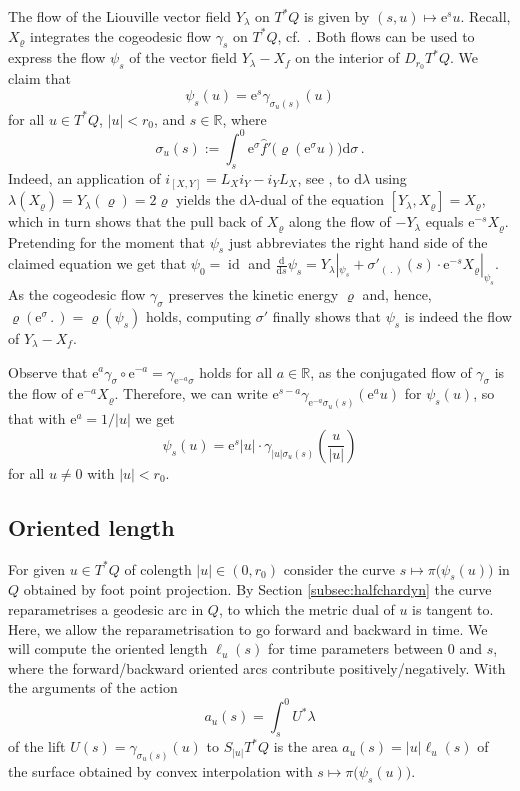 \documentclass{amsart}
\theoremstyle{definition}
\newcommand{\rmd}{\mathrm d}
\newcommand{\rme}{\mathrm e}
\newcommand{\R}{\mathbb R}
\DeclareMathOperator{\id}{\mathrm{id}}
\begin{document}
The flow of the Liouville vector field $Y_{\lambda}$ on $T^*Q$
is given by $(s,u)\mapsto\rme^su$.
Recall,
$X_{\varrho}$ integrates the cogeodesic flow $\gamma_s$
on $T^*Q$,
cf.\ \cite[p.~27-31]{gei08}.
Both flows can be used to express
the flow $\psi_s$ of the vector field $Y_{\lambda}-X_f$
on the interior of $D_{r_0}T^*Q$.
We claim that
\[
\psi_s(u)=\rme^s\gamma_{\sigma_u(s)}(u)
\]
for all $u\in T^*Q$, $|u|<r_0$, and $s\in\R$, where
\[
\sigma_u(s):=
\int_s^0
  \rme^{\sigma}\hat{f}'\big(\varrho(\rme^{\sigma}u)\big)
\rmd\sigma\,.
\]
Indeed,
an application of
$i_{[X,Y]}=L_Xi_Y-i_YL_X$, see \cite[Proposition V.5.3]{lng02},
to $\rmd\lambda$
using $\lambda(X_{\varrho})=Y_{\lambda}(\varrho)=2\varrho$
yields the $\rmd\lambda$-dual of the equation
$[Y_{\lambda},X_{\varrho}]=X_{\varrho}$,
which in turn shows that the pull back of $X_{\varrho}$
along the flow of $-Y_{\lambda}$ equals $\rme^{-s}X_{\varrho}$.
Pretending for the moment
that $\psi_s$ just abbreviates
the right hand side of the claimed equation
we get that $\psi_0=\id$ and
$
\frac{\rmd}{\rmd s}\psi_s=
Y_{\lambda}|_{\psi_s}+
\sigma'_{(\,.\,)}(s)\cdot\rme^{-s}X_{\varrho}|_{\psi_s}
$.
As the cogeodesic flow $\gamma_{\sigma}$
preserves the kinetic energy $\varrho$
and, hence,
$\varrho(\rme^{\sigma}\,.\,)=
\varrho(\psi_s)$ holds,
computing $\sigma'$ finally shows
that $\psi_s$ is indeed the flow of $Y_{\lambda}-X_f$.

Observe that
$\rme^a\gamma_{\sigma}\circ\rme^{-a}=\gamma_{\rme^{-a}\sigma}$
holds for all $a\in\R$,
as the conjugated flow of $\gamma_{\sigma}$
is the flow of $\rme^{-a}X_{\varrho}$.
Therefore,
we can write
$\rme^{s-a}\gamma_{\rme^{-a}\sigma_u(s)}(\rme^au)$
for $\psi_s(u)$,
so that with $\rme^a=1/|u|$ we get
\[
\psi_s(u)=\rme^s|u|\cdot\gamma_{|u|\sigma_u(s)}
\left(\frac{u}{|u|}\right)
\]
for all $u\neq0$ with $|u|<r_0$.



\subsection{Oriented length\label{subsec:orientedlength}}


For given $u\in T^*Q$ of colength $|u|\in(0,r_0)$
consider the curve $s\mapsto\pi\big(\psi_s(u)\big)$ in $Q$
obtained by foot point projection.
By Section \ref{subsec:halfchardyn}
the curve reparametrises a geodesic arc in $Q$,
to which the metric dual of $u$ is tangent to.
Here,
we allow the reparametrisation to go forward and backward in time.
We will compute the oriented length $\ell_u(s)$
for time parameters between $0$ and $s$,
where the forward/backward oriented arcs
contribute positively/negatively.
With the arguments of \cite[Section 3.4]{zeh13}
the action
\[
a_u(s)=\int_s^0U^*\lambda
\]
of the lift $U(s)=\gamma_{\sigma_u(s)}(u)$
to $S_{|u|}T^*Q$ 
is the area $a_u(s)=|u|\ell_u(s)$
of the surface obtained by convex interpolation
with $s\mapsto\pi\big(\psi_s(u)\big)$.
\end{document}
